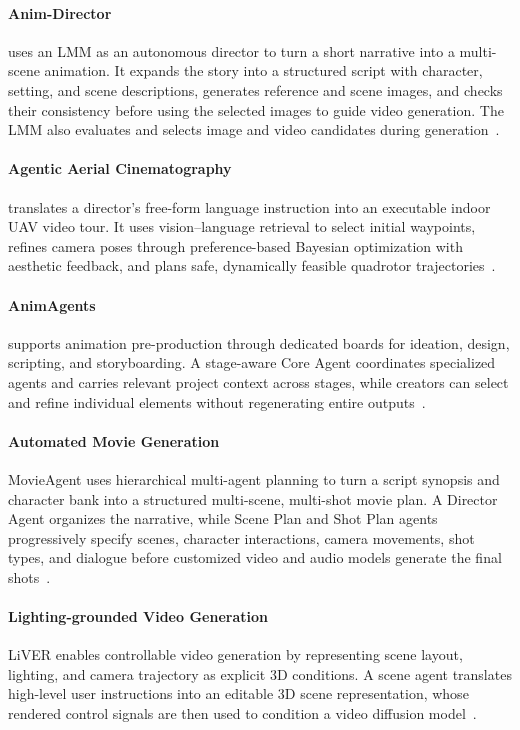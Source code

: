 \paragraph{Anim-Director}
 uses an LMM as an autonomous director to turn a short narrative into a multi-scene animation. It expands the story into a structured script with character, setting, and scene descriptions, generates reference and scene images, and checks their consistency before using the selected images to guide video generation. The LMM also evaluates and selects image and video candidates during generation~\cite{avg240809787}.

\paragraph{Agentic Aerial Cinematography}
 translates a director's free-form language instruction into an executable indoor UAV video tour. It uses vision--language retrieval to select initial waypoints, refines camera poses through preference-based Bayesian optimization with aesthetic feedback, and plans safe, dynamically feasible quadrotor trajectories~\cite{avg250916176}.

\paragraph{AnimAgents}
 supports animation pre-production through dedicated boards for ideation, design, scripting, and storyboarding. A stage-aware Core Agent coordinates specialized agents and carries relevant project context across stages, while creators can select and refine individual elements without regenerating entire outputs~\cite{avg251117906}.

\paragraph{Automated Movie Generation}
MovieAgent uses hierarchical multi-agent planning to turn a script synopsis and character bank into a structured multi-scene, multi-shot movie plan. A Director Agent organizes the narrative, while Scene Plan and Shot Plan agents progressively specify scenes, character interactions, camera movements, shot types, and dialogue before customized video and audio models generate the final shots~\cite{avg250307314}.

\paragraph{Lighting-grounded Video Generation}
LiVER enables controllable video generation by representing scene layout, lighting, and camera trajectory as explicit 3D conditions. A scene agent translates high-level user instructions into an editable 3D scene representation, whose rendered control signals are then used to condition a video diffusion model~\cite{avg260407966}.

